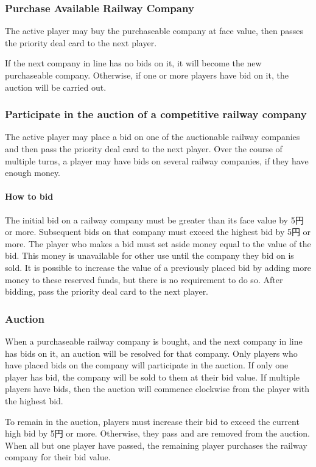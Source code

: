 \documentclass{article}
\begin{document}
\begin{CJK}{UTF8}{min}
\begin{multicols}{2}
\subsubsection{Purchase Available Railway Company}
The active player may buy the purchaseable company at face value, then
passes the priority deal card to the next player.

If the next company in line has no bids on it, it will become the new
purchaseable company. Otherwise, if one or more players have bid on
it, the auction will be carried out.

\subsubsection{Participate in the auction of a competitive railway company}
The active player may place a bid on one of the auctionable railway
companies and then pass the priority deal card to the next
player. Over the course of multiple turns, a player may have bids on
several railway companies, if they have enough money.

\paragraph{How to bid}\label{isr-bidding}

The initial bid on a railway company must be greater than its face
value by 5円 or more. Subsequent bids on that company must exceed
the highest bid by 5円 or more. The player who makes a bid must set
aside money equal to the value of the bid. This money is unavailable
for other use until the company they bid on is sold. It is possible to
increase the value of a previously placed bid by adding more money to
these reserved funds, but there is no requirement to do so. After
bidding, pass the priority deal card to the next player.

\subsubsection{Auction}
When a purchaseable railway company is bought, and the next company in
line has bids on it, an auction will be resolved for that
company. Only players who have placed bids on the company will
participate in the auction. If only one player has bid, the company
will be sold to them at their bid value. If multiple players have
bids, then the auction will commence clockwise from the player with
the highest bid.

To remain in the auction, players must increase their bid to exceed
the current high bid by 5円 or more. Otherwise, they pass and are
removed from the auction. When all but one player have passed, the
remaining player purchases the railway company for their bid value.


\end{multicols}
\end{CJK}
\end{document}
